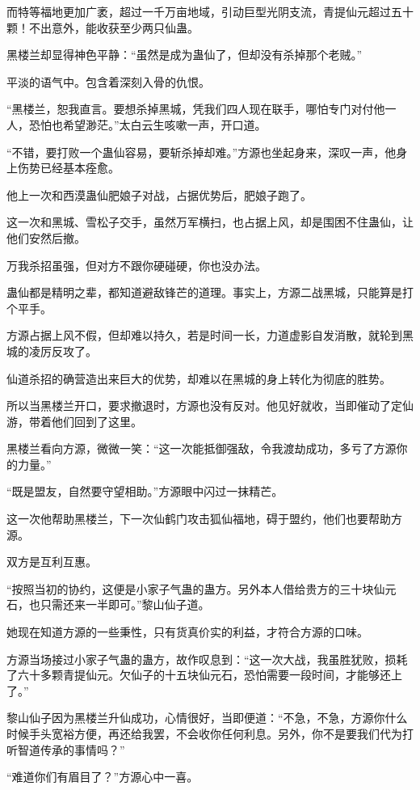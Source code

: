 \begin{this_body}
而特等福地更加广袤，超过一千万亩地域，引动巨型光阴支流，青提仙元超过五十颗！不出意外，能收获至少两只仙蛊。

黑楼兰却显得神色平静：“虽然是成为蛊仙了，但却没有杀掉那个老贼。”

平淡的语气中。包含着深刻入骨的仇恨。

“黑楼兰，恕我直言。要想杀掉黑城，凭我们四人现在联手，哪怕专门对付他一人，恐怕也希望渺茫。”太白云生咳嗽一声，开口道。

“不错，要打败一个蛊仙容易，要斩杀掉却难。”方源也坐起身来，深叹一声，他身上伤势已经基本痊愈。

他上一次和西漠蛊仙肥娘子对战，占据优势后，肥娘子跑了。

这一次和黑城、雪松子交手，虽然万军横扫，也占据上风，却是围困不住蛊仙，让他们安然后撤。

万我杀招虽强，但对方不跟你硬碰硬，你也没办法。

蛊仙都是精明之辈，都知道避敌锋芒的道理。事实上，方源二战黑城，只能算是打个平手。

方源占据上风不假，但却难以持久，若是时间一长，力道虚影自发消散，就轮到黑城的凌厉反攻了。

仙道杀招的确营造出来巨大的优势，却难以在黑城的身上转化为彻底的胜势。

所以当黑楼兰开口，要求撤退时，方源也没有反对。他见好就收，当即催动了定仙游，带着他们回到了这里。

黑楼兰看向方源，微微一笑：“这一次能抵御强敌，令我渡劫成功，多亏了方源你的力量。”

“既是盟友，自然要守望相助。”方源眼中闪过一抹精芒。

这一次他帮助黑楼兰，下一次仙鹤门攻击狐仙福地，碍于盟约，他们也要帮助方源。

双方是互利互惠。

“按照当初的协约，这便是小家子气蛊的蛊方。另外本人借给贵方的三十块仙元石，也只需还来一半即可。”黎山仙子道。

她现在知道方源的一些秉性，只有货真价实的利益，才符合方源的口味。

方源当场接过小家子气蛊的蛊方，故作叹息到：“这一次大战，我虽胜犹败，损耗了六十多颗青提仙元。欠仙子的十五块仙元石，恐怕需要一段时间，才能够还上了。”

黎山仙子因为黑楼兰升仙成功，心情很好，当即便道：“不急，不急，方源你什么时候手头宽裕方便，再还给我罢，不会收你任何利息。另外，你不是要我们代为打听智道传承的事情吗？”

“难道你们有眉目了？”方源心中一喜。


\end{this_body}
